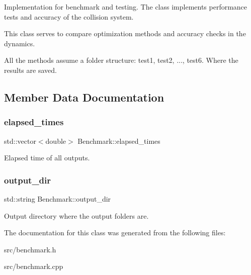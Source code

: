 Implementation for benchmark and testing. The class implements performance tests and accuracy of the collision system.

This class serves to compare optimization methods and accuracy checks in the dynamics.

All the methods assume a folder structure\+: test1, test2, ..., test6. Where the results are saved. 

\subsection{Member Data Documentation}
\mbox{\label{class_benchmark_aad25ea73aeb6800ef6a65a516559cb86}} 
\subsubsection{\texorpdfstring{elapsed\+\_\+times}{elapsed\_times}}
{\footnotesize\ttfamily std\+::vector$<$double$>$ Benchmark\+::elapsed\+\_\+times}

Elapsed time of all outputs. \mbox{\label{class_benchmark_a5cea4a90c86a242be2e8583054bf8b1c}} 
\subsubsection{\texorpdfstring{output\+\_\+dir}{output\_dir}}
{\footnotesize\ttfamily std\+::string Benchmark\+::output\+\_\+dir}

Output directory where the output folders are. 

The documentation for this class was generated from the following files\+:\begin{DoxyCompactItemize}
\item 
src/benchmark.\+h\item 
src/benchmark.\+cpp\end{DoxyCompactItemize}
